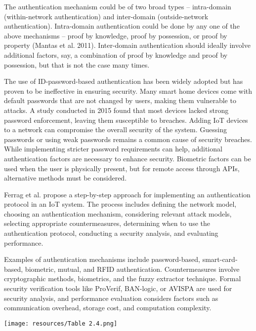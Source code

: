 The authentication mechanism could be of two broad types – intra-domain (within-network authentication) and inter-domain (outside-network authentication). Intra-domain authentication could be done by any one of the above mechanisms – proof by knowledge, proof by possession, or proof by property (Mantas et al. 2011). Inter-domain authentication should ideally involve additional factors, say, a combination of proof by knowledge and proof by possession, but that is not the case many times.

The use of ID-password-based authentication has been widely adopted but has proven to be ineffective in ensuring security. Many smart home devices come with default passwords that are not changed by users, making them vulnerable to attacks. A study conducted in 2015 found that most devices lacked strong password enforcement, leaving them susceptible to breaches. Adding IoT devices to a network can compromise the overall security of the system. Guessing passwords or using weak passwords remains a common cause of security breaches. While implementing stricter password requirements can help, additional authentication factors are necessary to enhance security. Biometric factors can be used when the user is physically present, but for remote access through APIs, alternative methods must be considered.


Ferrag et al. propose a step-by-step approach for implementing an authentication protocol in an IoT system. The process includes defining the network model, choosing an authentication mechanism, considering relevant attack models, selecting appropriate countermeasures, determining when to use the authentication protocol, conducting a security analysis, and evaluating performance.


Examples of authentication mechanisms include password-based, smart-card-based, biometric, mutual, and RFID authentication. Countermeasures involve cryptographic methods, biometrics, and the fuzzy extractor technique. Formal security verification tools like ProVerif, BAN-logic, or AVISPA are used for security analysis, and performance evaluation considers factors such as communication overhead, storage cost, and computation complexity.

\texttt{[image: resources/Table 2.4.png]}

